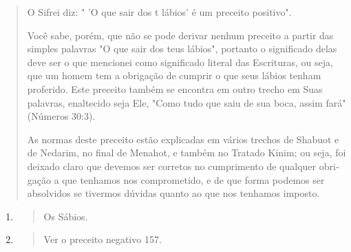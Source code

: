 \begin{quote}
O Sifrei diz: " 'O que sair dos t lábios' é um preceito positivo".

Você sabe, porém, que não se pode derivar nenhum preceito a partir das
sim­ples palavras "O que sair dos teus lábios", portanto o significado
delas deve ser o que mencionei como significado literal das Escrituras,
ou seja, que um homem tem a obrigação de cumprir o que seus lábios
tenham proferido. Este preceito também se encontra em outro trecho em
Suas palavras, enaltecido se­ja Ele, "Como tudo que saiu de sua boca,
assim fará" (Números 30:3).

As normas deste preceito estão explicadas em vários trechos de Sha­buot
e de Nedarim, no final de Menahot, e também no Tratado Kinim; ou seja,
foi deixado claro que devemos ser corretos no cumprimento de qualquer
obri­gação a que tenhamos nos comprometido, e de que forma podemos ser
absol­vidos se tivermos dúvidas quanto ao que nos tenhamos imposto.
\end{quote}

\begin{enumerate}
\def\labelenumi{\arabic{enumi}.}
\setcounter{enumi}{126}
\item
 \begin{quote}
 Os Sábios.
 \end{quote}
\item
 \begin{quote}
 Ver o preceito negativo 157.
 \end{quote}
\end{enumerate}

